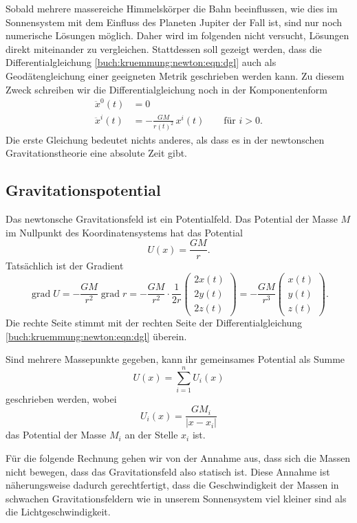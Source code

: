 Sobald mehrere massereiche Himmelskörper die Bahn beeinflussen,
wie dies im Sonnensystem mit dem Einfluss des Planeten Jupiter
%
%
der Fall ist, sind nur noch numerische Lösungen möglich.
Daher wird im folgenden nicht versucht, Lösungen direkt miteinander
zu vergleichen.
Stattdessen soll gezeigt werden, dass die Differentialgleichung
\eqref{buch:kruemmung:newton:eqn:dgl}
auch als Geodätengleichung einer geeigneten Metrik geschrieben
werden kann.
Zu diesem Zweck schreiben wir die Differentialgleichung noch in
der Komponentenform
\begin{equation}
\begin{aligned}
\ddot{x}^0(t) &= 0 \\
\ddot{x}^i(t) &= - \frac{GM}{r(t)^2}\,x^i(t)\qquad \text{für $i>0$}.
\end{aligned}
\label{buch:kruemmung:newton:eqn:dglcomponents}
\end{equation}
Die erste Gleichung bedeutet nichts anderes, als dass es in der
newtonschen Gravitationstheorie eine absolute Zeit gibt.
%

%
%
\subsection{Gravitationspotential}
Das newtonsche Gravitationsfeld ist ein Potentialfeld.
Das Potential der Masse $M$ im Nullpunkt des Koordinatensystems
hat das Potential
\[
U(x) = \frac{GM}{r}.
\]
%
Tatsächlich ist der Gradient 
\[
\operatorname{grad}U
=
-\frac{GM}{r^2} \operatorname{grad}{r}
=
-\frac{GM}{r^2}
\cdot
\frac{1}{2r}
\begin{pmatrix}
2x(t)\\
2y(t)\\
2z(t)
\end{pmatrix}
=
-\frac{GM}{r^3}
\begin{pmatrix}
x(t)\\
y(t)\\
z(t)
\end{pmatrix}
.
\]
Die rechte Seite stimmt mit der rechten Seite der Differentialgleichung
\eqref{buch:kruemmung:newton:eqn:dgl}
überein.

Sind mehrere Massepunkte gegeben, kann ihr gemeinsames Potential 
als Summe
\[
U(x)
=
\sum_{i=1}^n U_i(x)
\]
geschrieben werden, wobei
\[
U_i(x)
=
\frac{GM_i}{|x-x_i|}
\]
das Potential der Masse $M_i$ an der Stelle $x_i$ ist.

Für die folgende Rechnung gehen wir von der Annahme aus, dass sich die
Massen nicht bewegen, dass das Gravitationsfeld also statisch ist.
Diese Annahme ist näherungsweise dadurch gerechtfertigt, dass die
Geschwindigkeit der Massen in schwachen Gravitationsfeldern wie in
unserem Sonnensystem viel kleiner sind als die Lichtgeschwindigkeit.

